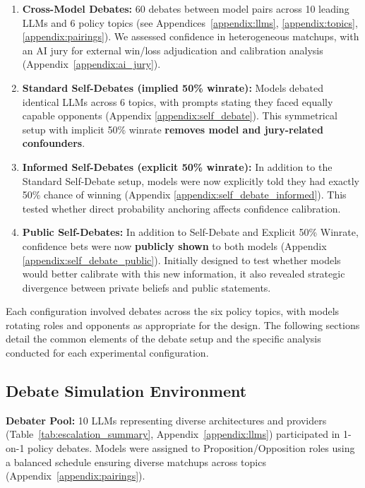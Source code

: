 \documentclass{article}
\begin{document}
\begin{enumerate}
    \item \textbf{Cross-Model Debates:} 60 debates between model pairs across 10 leading LLMs and 6 policy topics (see Appendices~\ref{appendix:llms}, \ref{appendix:topics}, \ref{appendix:pairings}). We assessed confidence in heterogeneous matchups, with an AI jury for external win/loss adjudication and calibration analysis (Appendix~\ref{appendix:ai_jury}).

    \item \textbf{Standard Self-Debates (implied 50\% winrate):} Models debated identical LLMs across 6 topics, with prompts stating they faced equally capable opponents (Appendix \ref{appendix:self_debate}). This symmetrical setup with implicit 50\% winrate \textbf{removes model and jury-related confounders}.

    \item \textbf{Informed Self-Debates (explicit 50\% winrate):} In addition to the Standard Self-Debate setup, models were now explicitly told they had exactly 50\% chance of winning (Appendix \ref{appendix:self_debate_informed}). This tested whether direct probability anchoring affects confidence calibration.

    \item \textbf{Public Self-Debates:} In addition to Self-Debate and Explicit 50\% Winrate, confidence bets were now \textbf{publicly shown} to both models (Appendix \ref{appendix:self_debate_public}). Initially designed to test whether models would better calibrate with this new information, it also revealed strategic divergence between private beliefs and public statements.
\end{enumerate}
Each configuration involved debates across the six policy topics, with models rotating roles and opponents as appropriate for the design. The following sections detail the common elements of the debate setup and the specific analysis conducted for each experimental configuration.

\subsection{Debate Simulation Environment}
\label{subsec:debate_env}

\textbf{Debater Pool:} 10 LLMs representing diverse architectures and providers (Table~\ref{tab:escalation_summary}, Appendix~\ref{appendix:llms}) participated in 1-on-1 policy debates. Models were assigned to Proposition/Opposition roles using a balanced schedule ensuring diverse matchups across topics (Appendix~\ref{appendix:pairings}).
\end{document}
